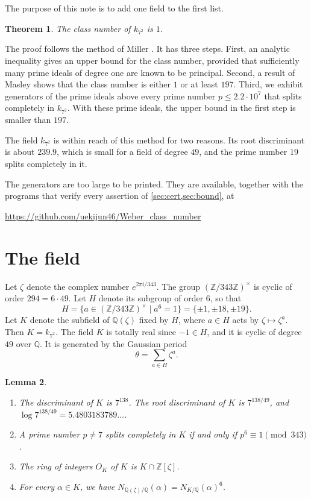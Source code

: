 \documentclass[11pt]{amsart}
\theoremstyle{plain}
\newtheorem{theorem}{Theorem}[section]
\newtheorem{lemma}[theorem]{Lemma}
\theoremstyle{definition}
\begin{document}
The purpose of this note is to add one field to the first list.

\begin{theorem} \label{thm:main}
The class number of $k_{7^2}$ is $1$.
\end{theorem}

The proof follows the method of Miller \cite{Mi14, Mi15b}.
It has three steps.
First, an analytic inequality gives an upper bound for the class number, provided that sufficiently many prime ideals of degree one are known to be principal.
Second, a result of Masley shows that the class number is either $1$ or at least $197$.
Third, we exhibit generators of the prime ideals above every prime number $p \le 2.2 \cdot 10^7$ that splits completely in $k_{7^2}$.
With these prime ideals, the upper bound in the first step is smaller than $197$.

The field $k_{7^2}$ is within reach of this method for two reasons.
Its root discriminant is about $239.9$, which is small for a field of degree $49$, and the prime number $19$ splits completely in it.

The generators are too large to be printed.
They are available, together with the programs that verify every assertion of \cref{sec:cert,sec:bound}, at
\begin{center}
\url{https://github.com/uekijun46/Weber_class_number}
\end{center}

\section{The field} \label{sec:field}

Let $\zeta$ denote the complex number $e^{2\pi i/343}$.
The group $(\mathbb{Z}/343\mathbb{Z})^\times$ is cyclic of order $294 = 6 \cdot 49$.
Let $H$ denote its subgroup of order $6$, so that
\[
H = \{a \in (\mathbb{Z}/343\mathbb{Z})^\times \mid a^6 = 1\} = \{\pm 1, \pm 18, \pm 19\}.
\]
Let $K$ denote the subfield of $\mathbb{Q}(\zeta)$ fixed by $H$, where $a \in H$ acts by $\zeta \mapsto \zeta^a$.
Then $K = k_{7^2}$.
The field $K$ is totally real since $-1 \in H$, and it is cyclic of degree $49$ over $\mathbb{Q}$.
It is generated by the Gaussian period
\[
\theta = \sum_{a \in H} \zeta^a .
\]

\begin{lemma} \label{lem:field}
\begin{enumerate}
\item The discriminant of $K$ is $7^{138}$. The root discriminant of $K$ is $7^{138/49}$, and $\log 7^{138/49} = 5.4803183789\ldots$.
\item A prime number $p \ne 7$ splits completely in $K$ if and only if $p^6 \equiv 1 \pmod{343}$.
\item The ring of integers $O_K$ of $K$ is $K \cap \mathbb{Z}[\zeta]$.
\item For every $\alpha \in K$, we have $N_{\mathbb{Q}(\zeta)/\mathbb{Q}}(\alpha) = N_{K/\mathbb{Q}}(\alpha)^6$.
\end{enumerate}
\end{lemma}
\end{document}
